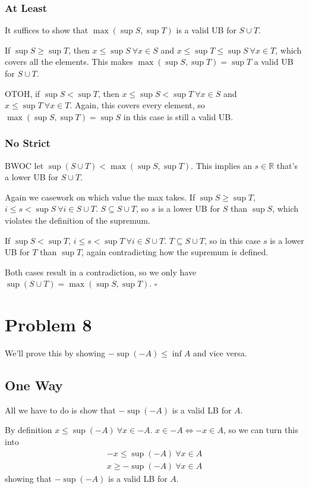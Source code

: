 \documentclass[12pt]{article}
\begin{document}
\subsubsection{At Least}

It suffices to show that $\max(\sup S, \sup T)$ is a valid UB for $S \cup T$.

If $\sup S \ge \sup T$, then $x \le \sup S\ \forall x \in S$ and $x \le \sup T \le \sup S\ \forall x \in T$,
which covers all the elements.
This makes $\max(\sup S, \sup T)=\sup T$ a valid UB for $S \cup T$.

OTOH, if $\sup S < \sup T$, then $x \le \sup S < \sup T\ \forall x \in S$ and $x \le \sup T\ \forall x \in T$.
Again, this covers every element, so $\max(\sup S, \sup T)=\sup S$ in this case is still a valid UB.

\subsubsection{No Strict}

BWOC let $\sup(S \cup T) < \max(\sup S, \sup T)$.
This implies an $s \in \mathbb{R}$ that's a lower UB for $S \cup T$.

Again we casework on which value the max takes.
If $\sup S \ge \sup T$, $i \le s < \sup S\ \forall i \in S \cup T$.
$S \subseteq S \cup T$, so $s$ is a lower UB for $S$ than $\sup S$, which violates the
definition of the supremum.

If $\sup S < \sup T$, $i \le s < \sup T\ \forall i \in S \cup T$.
$T \subseteq S \cup T$, so in this case $s$ is a lower UB for $T$ than $\sup T$,
again contradicting how the supremum is defined.

Both cases result in a contradiction, so we only have $\sup(S \cup T)=\max(\sup S, \sup T)$. $\square$

\pagebreak

\section{Problem 8}

We'll prove this by showing $-\sup(-A) \le \inf A$ and vice versa.

\subsection{One Way}

All we have to do is show that $-\sup(-A)$ is a valid LB for $A$.

By definition $x \le \sup(-A)\ \forall x \in -A$.
$x \in -A \iff -x \in A$, so we can turn this into
\begin{gather*}
      -x \le \sup(-A)\ \forall x \in A \\
      x \ge -\sup(-A)\ \forall x \in A
\end{gather*}
showing that $-\sup(-A)$ is a valid LB for $A$.
\end{document}
